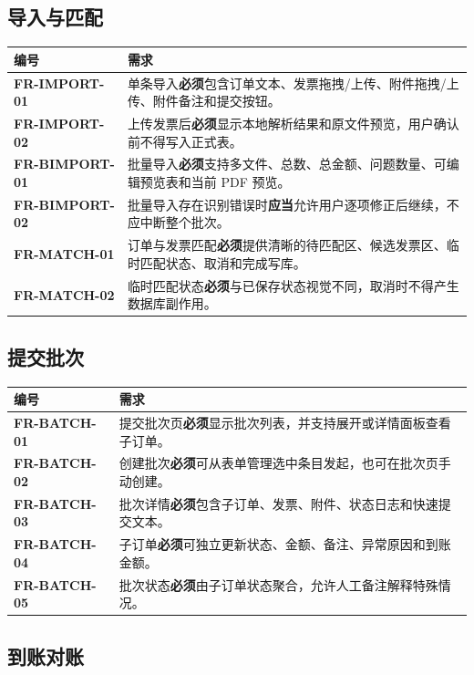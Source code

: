 \documentclass[UTF8,zihao=-4]{ctexart}
\newcommand{\req}[1]{\textbf{\textcolor{ivicBrown}{#1}}}
\newcommand{\must}{\textbf{必须}}
\newcommand{\should}{\textbf{应当}}
\begin{document}
\subsection{导入与匹配}

\begin{longtable}{p{2.8cm}p{11.6cm}}
\toprule
编号 & 需求 \\
\midrule
\req{FR-IMPORT-01} & 单条导入\must{}包含订单文本、发票拖拽/上传、附件拖拽/上传、附件备注和提交按钮。 \\
\req{FR-IMPORT-02} & 上传发票后\must{}显示本地解析结果和原文件预览，用户确认前不得写入正式表。 \\
\req{FR-BIMPORT-01} & 批量导入\must{}支持多文件、总数、总金额、问题数量、可编辑预览表和当前 PDF 预览。 \\
\req{FR-BIMPORT-02} & 批量导入存在识别错误时\should{}允许用户逐项修正后继续，不应中断整个批次。 \\
\req{FR-MATCH-01} & 订单与发票匹配\must{}提供清晰的待匹配区、候选发票区、临时匹配状态、取消和完成写库。 \\
\req{FR-MATCH-02} & 临时匹配状态\must{}与已保存状态视觉不同，取消时不得产生数据库副作用。 \\
\bottomrule
\end{longtable}

\subsection{提交批次}

\begin{longtable}{p{2.8cm}p{11.6cm}}
\toprule
编号 & 需求 \\
\midrule
\req{FR-BATCH-01} & 提交批次页\must{}显示批次列表，并支持展开或详情面板查看子订单。 \\
\req{FR-BATCH-02} & 创建批次\must{}可从表单管理选中条目发起，也可在批次页手动创建。 \\
\req{FR-BATCH-03} & 批次详情\must{}包含子订单、发票、附件、状态日志和快速提交文本。 \\
\req{FR-BATCH-04} & 子订单\must{}可独立更新状态、金额、备注、异常原因和到账金额。 \\
\req{FR-BATCH-05} & 批次状态\must{}由子订单状态聚合，允许人工备注解释特殊情况。 \\
\bottomrule
\end{longtable}

\subsection{到账对账}
\end{document}

